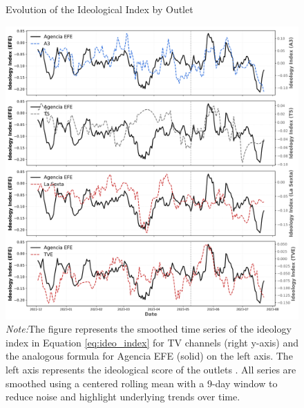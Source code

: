 \documentclass[12pt]{article}
\begin{document}
	
	\begin{figure}[!htb]
		\caption{Evolution of the Ideological Index by Outlet}
		\centering
		\includegraphics[width=150mm]{figures/tv_vs_efe_net_diff_by_channel}
		\caption*{\small \textit{Note:}The figure represents the smoothed time series of the ideology index in Equation \ref{eq:ideo_index} for TV channels (right y-axis) and the analogous formula for Agencia EFE (solid) on the left axis. The left axis represents the ideological score of the outlets . All series are smoothed using a centered rolling mean with a 9-day window to reduce noise and highlight underlying trends over time.}
		\label{fig:net_tone_by_channel}
	\end{figure}
	
	
	
\end{document}
